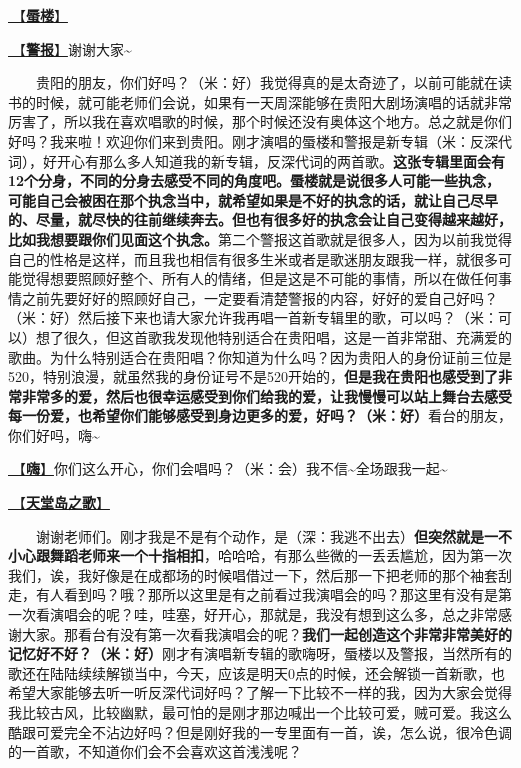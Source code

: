 \documentclass[]{ctexbook}
\begin{document}
\hyperref[mirage]{🎵【\textbf{蜃楼}】}

\hyperref[the-giver]{🎵【\textbf{警报}】}谢谢大家\textasciitilde{}

  贵阳的朋友，你们好吗？（米：好）我觉得真的是太奇迹了，以前可能就在读书的时候，就可能老师们会说，如果有一天周深能够在贵阳大剧场演唱的话就非常厉害了，所以我在喜欢唱歌的时候，那个时候还没有奥体这个地方。总之就是你们好吗？我来啦！欢迎你们来到贵阳。刚才演唱的蜃楼和警报是新专辑（米：反深代词），好开心有那么多人知道我的新专辑，反深代词的两首歌。\textbf{这张专辑里面会有12个分身，不同的分身去感受不同的角度吧。蜃楼就是说很多人可能一些执念，可能自己会被困在那个执念当中，就希望如果是不好的执念的话，就让自己尽早的、尽量，就尽快的往前继续奔去。但也有很多好的执念会让自己变得越来越好，比如我想要跟你们见面这个执念。}第二个警报这首歌就是很多人，因为以前我觉得自己的性格是这样，而且我也相信有很多生米或者是歌迷朋友跟我一样，就很多可能觉得想要照顾好整个、所有人的情绪，但是这是不可能的事情，所以在做任何事情之前先要好好的照顾好自己，一定要看清楚警报的内容，好好的爱自己好吗？（米：好）然后接下来也请大家允许我再唱一首新专辑里的歌，可以吗？（米：可以）想了很久，但这首歌我发现他特别适合在贵阳唱，这是一首非常甜、充满爱的歌曲。为什么特别适合在贵阳唱？你知道为什么吗？因为贵阳人的身份证前三位是520，特别浪漫，就虽然我的身份证号不是520开始的，\textbf{但是我在贵阳也感受到了非常非常多的爱，然后也很幸运感受到你们给我的爱，让我慢慢可以站上舞台去感受每一份爱，也希望你们能够感受到身边更多的爱，好吗？（米：好）}看台的朋友，你们好吗，嗨\textasciitilde{}

\hyperref[say-hi]{🎵【\textbf{嗨}】}你们这么开心，你们会唱吗？（米：会）我不信\textasciitilde 全场跟我一起\textasciitilde{}

\hyperref[haven-song]{🎵【\textbf{天堂岛之歌}】}

  谢谢老师们。刚才我是不是有个动作，是（深：我逃不出去）\textbf{但突然就是一不小心跟舞蹈老师来一个十指相扣}，哈哈哈，有那么些微的一丢丢尴尬，因为第一次我们，诶，我好像是在成都场的时候唱借过一下，然后那一下把老师的那个袖套刮走，有人看到吗？哦？那所以这里是有之前看过我演唱会的吗？那这里有没有是第一次看演唱会的呢？哇，哇塞，好开心，那就是，我没有想到这么多，总之非常感谢大家。那看台有没有第一次看我演唱会的呢？\textbf{我们一起创造这个非常非常美好的记忆好不好？（米：好）}刚才有演唱新专辑的歌嗨呀，蜃楼以及警报，当然所有的歌还在陆陆续续解锁当中，今天，应该是明天0点的时候，还会解锁一首新歌，也希望大家能够去听一听反深代词好吗？了解一下比较不一样的我，因为大家会觉得我比较古风，比较幽默，最可怕的是刚才那边喊出一个比较可爱，贼可爱。我这么酷跟可爱完全不沾边好吗？但是刚好我的一专里面有一首，诶，怎么说，很冷色调的一首歌，不知道你们会不会喜欢这首浅浅呢？
\end{document}
